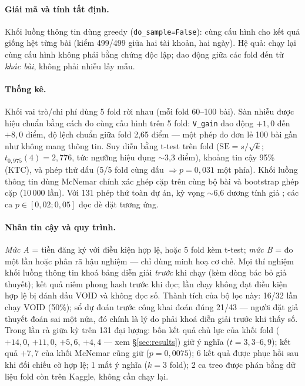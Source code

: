 \documentclass[12pt,a4paper]{article}
\begin{document}
\paragraph{Giải mã và tính tất định.} Khối luồng thông tin dùng greedy
(\texttt{do\_sample=False}): cùng cấu hình cho kết quả giống hệt từng bài (kiểm 499/499 giữa
hai tài khoản, hai ngày). Hệ quả: chạy lại cùng cấu hình không phải bằng chứng độc lập; dao
động giữa các fold đến từ \emph{khác bài}, không phải nhiễu lấy mẫu.

\paragraph{Thống kê.} Khối vai trò/chi phí dùng 5 fold rời nhau (mỗi fold 60--100 bài). Sàn
nhiễu được hiệu chuẩn bằng cách đo cùng cấu hình trên 5 fold: \texttt{V\_gain} dao động
$+1{,}0$ đến $+8{,}0$ điểm, độ lệch chuẩn giữa fold 2,65 điểm --- một phép đo đơn lẻ 100 bài
gần như không mang thông tin. Suy diễn bằng t-test trên fold ($\mathrm{SE}=s/\sqrt{k}$;
$t_{0{,}975}(4)=2{,}776$, tức ngưỡng hiệu dụng $\sim$3,3 điểm), khoảng tin cậy 95\% (KTC), và
phép thử dấu (5/5 fold cùng dấu $\Rightarrow p=0{,}031$ một phía). Khối luồng thông tin dùng
McNemar chính xác ghép cặp trên cùng bộ bài và bootstrap ghép cặp (10\,000 lần). Với 131 phép
thử toàn dự án, kỳ vọng $\sim$6,6 dương tính giả \cite{bh1995}; các ca $p \in [0{,}02;0{,}05]$
đọc dè dặt tương ứng.

\paragraph{Nhãn tin cậy và quy trình.} \emph{Mức A} = tiền đăng ký với điều kiện hợp lệ, hoặc 5
fold kèm t-test; \emph{mức B} = đo một lần hoặc phân rã hậu nghiệm --- chỉ dùng minh hoạ cơ
chế. Mọi thí nghiệm khối luồng thông tin khoá bảng diễn giải \emph{trước} khi chạy (kèm dòng
bác bỏ giả thuyết); kết quả niêm phong hash trước khi đọc; lần chạy không đạt điều kiện hợp lệ
bị đánh dấu VOID và không đọc số. Thành tích của bộ lọc này: 16/32 lần chạy VOID (50\%); sổ dự
đoán trước công khai đoán đúng 21/43 --- người đặt giả thuyết đoán sai một nửa, đó chính là lý
do phải khoá diễn giải trước khi thấy số. Trong lần rà giữa kỳ trên 131 đại lượng: bốn kết quả
chủ lực của khối fold ($+14{,}0$, $+11{,}0$, $+5{,}6$, $+4{,}4$ --- xem \S\ref{sec:results})
giữ ý nghĩa ($t=3{,}3$--$6{,}9$); kết quả $+7{,}7$ của khối McNemar cũng giữ ($p=0{,}0075$);
6 kết quả được phục hồi sau khi đối chiếu cờ hợp lệ; 1 mất ý nghĩa ($k{=}3$ fold); 2 ca treo
được phán bằng dữ liệu fold còn trên Kaggle, không cần chạy lại.
\end{document}
